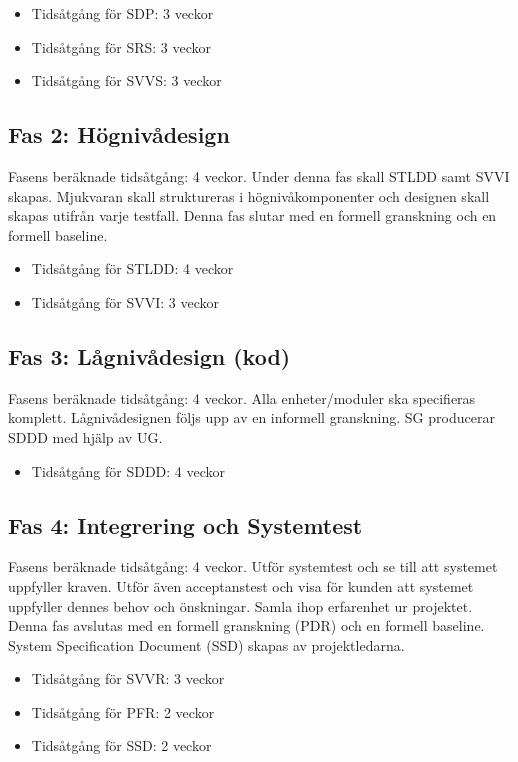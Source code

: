 ﻿\documentclass[a4paper]{article}
\begin{document}
\begin{itemize}
\item{Tidsåtgång för SDP: 3 veckor}
\item{Tidsåtgång för SRS: 3 veckor}
\item{Tidsåtgång för SVVS: 3 veckor}
\end{itemize}

\subsection{Fas 2: Högnivådesign}
Fasens beräknade tidsåtgång: 4 veckor.\newline
Under denna fas skall STLDD samt SVVI skapas. Mjukvaran skall struktureras i högnivåkomponenter och designen skall skapas utifrån varje testfall. Denna fas slutar med en formell granskning och en formell baseline.

\begin{itemize}
\item{Tidsåtgång för STLDD: 4 veckor}
\item{Tidsåtgång för SVVI: 3 veckor}
\end{itemize}

\subsection{Fas 3: Lågnivådesign (kod)}
Fasens beräknade tidsåtgång: 4 veckor.\newline
Alla enheter/moduler ska specifieras komplett. Lågnivådesignen följs upp av en informell granskning. SG producerar SDDD med hjälp av UG.
\begin{itemize}
\item{Tidsåtgång för SDDD: 4 veckor}
\end{itemize}

\subsection{Fas 4: Integrering och Systemtest}
Fasens beräknade tidsåtgång: 4 veckor.\newline
Utför systemtest och se till att systemet uppfyller kraven. Utför även acceptanstest och visa för kunden att systemet uppfyller dennes behov och önskningar. Samla ihop erfarenhet ur projektet. Denna fas avslutas med en formell granskning (PDR) och en formell baseline. System Specification Document (SSD) skapas av projektledarna.
\begin{itemize}
\item{Tidsåtgång för SVVR: 3 veckor}
\item{Tidsåtgång för PFR: 2 veckor}
\item{Tidsåtgång för SSD: 2 veckor}
\end{itemize}
\end{document}
